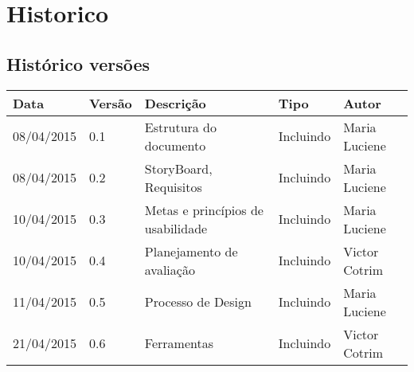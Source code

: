 \chapter[Historico]{Historico}

\section{Histórico versões}

\begin{table}[h]
	\centering
	\begin{tabular}{|l|l|l|l|l|}
		\hline
		Data & Versão & Descrição & Tipo & Autor \\ \hline
		08/04/2015 & 0.1 & Estrutura do documento & Incluindo & Maria Luciene \\ \hline
		08/04/2015 & 0.2 & StoryBoard, Requisitos & Incluindo & Maria Luciene \\ \hline
		10/04/2015 & 0.3 & Metas e princípios de usabilidade & Incluindo & Maria Luciene \\ \hline
		10/04/2015 & 0.4 & Planejamento de avaliação & Incluindo & Victor Cotrim \\ \hline
		11/04/2015 & 0.5 & Processo de Design & Incluindo & Maria Luciene \\ \hline	
		21/04/2015 & 0.6 & Ferramentas & Incluindo & Victor Cotrim \\ \hline	
	\end{tabular}
\end{table}
